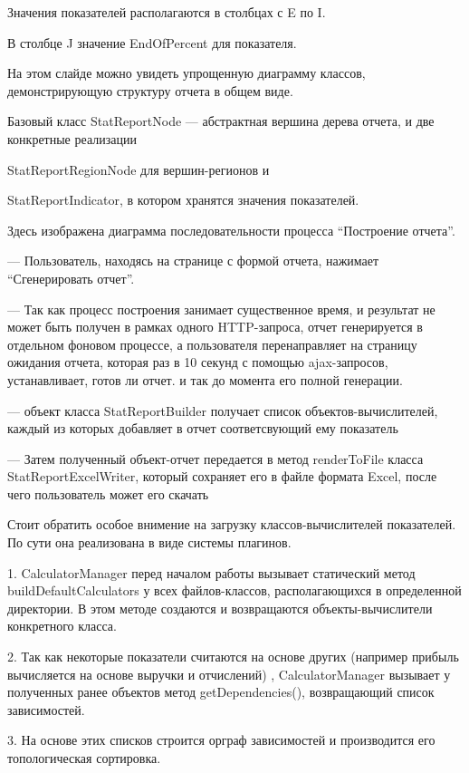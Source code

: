 \documentclass[a4paper]{article}
\begin{document}
Значения показателей располагаются в столбцах с E по I.

В столбце J значение EndOfPercent для показателя.

\newpage

На этом слайде можно увидеть упрощенную диаграмму классов, демонстрирующую структуру отчета в общем виде.

Базовый класс StatReportNode --- абстрактная вершина дерева отчета,
и две конкретные реализации 

StatReportRegionNode для вершин-регионов и

StatReportIndicator, в котором хранятся значения показателей.

\newpage

Здесь изображена диаграмма последовательности процесса “Построение отчета”.

--- Пользователь, находясь на странице с формой отчета, нажимает “Сгенерировать отчет”.

--- Так как процесс построения занимает существенное время, и результат не может быть получен в рамках одного HTTP-запроса, 
отчет генерируется в отдельном фоновом процессе, а пользователя перенаправляет на страницу ожидания отчета, которая раз в 10 секунд с помощью ajax-запросов, устанавливает, готов ли отчет.
и так до момента его полной генерации.

--- объект класса StatReportBuilder получает список объектов-вычислителей, каждый из которых добавляет в отчет соответсвующий ему показатель

--- Затем полученный объект-отчет передается в метод renderToFile класса StatReportExcelWriter, который сохраняет его в файле формата Excel, после чего пользователь может его скачать

\newpage
Стоит обратить особое внимение на загрузку классов-вычислителей показателей. По сути она реализована в виде системы плагинов.

1. CalculatorManager перед началом работы вызывает статический метод buildDefaultCalculators у всех файлов-классов, располагающихся в определенной директории.
В этом методе создаются и возвращаются объекты-вычислители конкретного класса.

2. Так как некоторые показатели считаются на основе других 
(например прибыль вычисляется на основе выручки и отчислений)
, CalculatorManager вызывает у полученных ранее объектов метод getDependencies(), возвращающий список зависимостей.

3. На основе этих списков строится орграф зависимостей и производится его топологическая сортировка.
\end{document}
